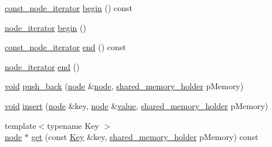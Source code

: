 \begin{DoxyCompactItemize}
\item 
\mbox{\hyperlink{namespace_y_a_m_l_1_1detail_a049af8e269401cbe1e735033914e4356}{const\+\_\+node\+\_\+iterator}} \mbox{\hyperlink{class_y_a_m_l_1_1detail_1_1node__data_aee8d9e1ee89a512c2df989c513ab5eba}{begin}} () const
\item 
\mbox{\hyperlink{namespace_y_a_m_l_1_1detail_aa2a961156810d41a3b6744c10186afac}{node\+\_\+iterator}} \mbox{\hyperlink{class_y_a_m_l_1_1detail_1_1node__data_a09fccbdf67e54810dfd5d4cf3a6e8b8f}{begin}} ()
\item 
\mbox{\hyperlink{namespace_y_a_m_l_1_1detail_a049af8e269401cbe1e735033914e4356}{const\+\_\+node\+\_\+iterator}} \mbox{\hyperlink{class_y_a_m_l_1_1detail_1_1node__data_a426ba063be0b0ad4e5a590f966b200b6}{end}} () const
\item 
\mbox{\hyperlink{namespace_y_a_m_l_1_1detail_aa2a961156810d41a3b6744c10186afac}{node\+\_\+iterator}} \mbox{\hyperlink{class_y_a_m_l_1_1detail_1_1node__data_a6afbee969af24854ba720d5f97927e19}{end}} ()
\item 
\mbox{\hyperlink{glad_8h_a950fc91edb4504f62f1c577bf4727c29}{void}} \mbox{\hyperlink{class_y_a_m_l_1_1detail_1_1node__data_a76de77be8b4233497aa0b9be17051907}{push\+\_\+back}} (\mbox{\hyperlink{class_y_a_m_l_1_1detail_1_1node}{node}} \&\mbox{\hyperlink{class_y_a_m_l_1_1detail_1_1node}{node}}, \mbox{\hyperlink{namespace_y_a_m_l_1_1detail_a228c4b3b6ba1058b474d40afc218e21d}{shared\+\_\+memory\+\_\+holder}} p\+Memory)
\item 
\mbox{\hyperlink{glad_8h_a950fc91edb4504f62f1c577bf4727c29}{void}} \mbox{\hyperlink{class_y_a_m_l_1_1detail_1_1node__data_a85f6c36524a1e159072bd1417eecbf83}{insert}} (\mbox{\hyperlink{class_y_a_m_l_1_1detail_1_1node}{node}} \&key, \mbox{\hyperlink{class_y_a_m_l_1_1detail_1_1node}{node}} \&\mbox{\hyperlink{glad_8h_a03aff08f73d7fde3d1a08e0abd8e84fa}{value}}, \mbox{\hyperlink{namespace_y_a_m_l_1_1detail_a228c4b3b6ba1058b474d40afc218e21d}{shared\+\_\+memory\+\_\+holder}} p\+Memory)
\item 
{\footnotesize template$<$typename Key $>$ }\\\mbox{\hyperlink{class_y_a_m_l_1_1detail_1_1node}{node}} $\ast$ \mbox{\hyperlink{class_y_a_m_l_1_1detail_1_1node__data_a6943f32eb9e9029c533b369286bb5123}{get}} (const \mbox{\hyperlink{namespace_y_a_m_l_a67c320aa50d3de7ecba1d0b8775dd684a1af533fc24b0311b8c4d5ac2870283aa}{Key}} \&key, \mbox{\hyperlink{namespace_y_a_m_l_1_1detail_a228c4b3b6ba1058b474d40afc218e21d}{shared\+\_\+memory\+\_\+holder}} p\+Memory) const
\item 

\end{DoxyCompactItemize}
